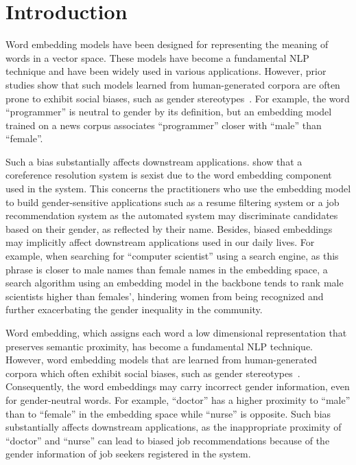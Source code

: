 \section{Introduction}{\label{tab:intro}}

Word embedding models have been designed for representing the meaning of words in a vector space. These models have become a fundamental NLP technique and have been widely used in various applications. However, prior studies show that such models learned from human-generated corpora are often prone to exhibit social biases, such as gender stereotypes~\cite{kaiwei,caliskan2017semantics}. 
For example,  the word ``programmer'' is neutral to gender by its definition, but an embedding model trained on a news corpus  associates ``programmer'' closer with ``male'' than  ``female''. 

Such a bias substantially affects downstream applications.   show that a coreference resolution system is sexist due to the word embedding component used in the system. This concerns the practitioners who use the embedding model to build gender-sensitive applications such as a resume filtering system or a job recommendation system as the automated system may discriminate candidates based on their gender, as reflected by their name.
Besides, biased embeddings may implicitly affect downstream applications used in our daily lives. For example, when searching for ``computer scientist'' using a search engine, as this phrase is closer to male names than female names in the embedding space, a search algorithm using an embedding model in the backbone tends to rank male scientists higher than females', hindering women from being recognized and further exacerbating the gender inequality in the community.

\iffalse
Word embedding, which assigns each word a low dimensional representation that preserves semantic proximity,  has become a fundamental NLP technique.
However, word embedding models that are learned from human-generated corpora which often exhibit social biases, such as gender stereotypes~\cite{kaiwei}. 
Consequently, the word embeddings may carry incorrect gender information, even for  gender-neutral words. For example, ``doctor'' has a higher proximity to ``male'' than to ``female'' in the embedding space while ``nurse'' is opposite.
Such bias substantially affects downstream applications, as the inappropriate proximity of ``doctor'' and ``nurse'' can lead to biased job recommendations because of the gender information of job seekers registered in the system.

